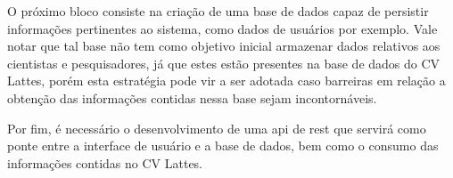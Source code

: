 O próximo bloco consiste na criação de uma base de dados capaz de persistir informações pertinentes ao sistema, como dados de usuários por exemplo. Vale notar que tal base não tem como objetivo inicial armazenar dados relativos aos cientistas e pesquisadores, já que estes estão presentes na base de dados do CV Lattes, porém esta estratégia pode vir a ser adotada caso barreiras em relação a obtenção das informações contidas nessa base sejam incontornáveis. 

Por fim, é necessário o desenvolvimento de uma \gls{api} de \gls{rest} que servirá como ponte entre a interface de usuário e a base de dados, bem como o consumo das informações contidas no CV Lattes.



